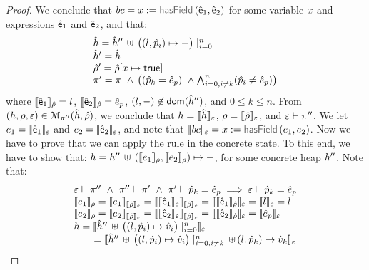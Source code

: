 \begin{proof}
\noindent{}
We conclude that  $\bcmd = \jvar := \hasfield(\pvsexpr_1, \pvsexpr_2)$ for some variable $\jvar$ and expressions $\pvsexpr_1$ and $\pvsexpr_2$, and that: 
$$
\begin{array}{l}
  \sheap =   \sheap'' \, \uplus \, \big((l, \sexprp_i) \mapsto -\big)\mid_{i = 0}^n     \\
  \sheap' =  \sheap \\
  \sstore' = \sstore[\jvar \mapsto \jtrue] \\ 
    \pc' = \pc \ \wedge \, \big( (\sexprp_k = \sexpr_p) \ \wedge \bigwedge_{i = 0, i \neq k}^n (\sexprp_i \neq \sexpr_p) \big)
\end{array}
$$ 
where $\symbeval{\pvsexpr_1}{\sstore} =  \loc$, $\symbeval{\pvsexpr_2}{\sstore} =  \sexpr_p$, 
$(\loc, -) \not\in \domain(\sheap'')$, and $0 \leq k \leq n$. 
%
From $(\heap, \store, \senv) \in \smodels{\sheap, \sstore}{\pc''}$, we conclude that $\heap = \semexpr{\sheap}{\senv}$, $\store = \semexpr{\sstore}{\senv}$, and 
$\senv \vdash \pc''$. 
We let $\jsilexpr_1 = \symbeval{\pvsexpr_1}{\senv}$ and  
$\jsilexpr_2 = \symbeval{\pvsexpr_2}{\senv}$, and note that $\symbeval{\bcmd}{\senv} = \jvar := \hasfield(\jsilexpr_1, \jsilexpr_2)$.
Now we have to prove that we can apply the  rule in the concrete state.
To this end, we have to show that:
$\heap = \heap'' \dunion (\symbeval{\jsilexpr_1}{\store}, \symbeval{\jsilexpr_2}{\store}) \mapsto -$, for 
some concrete heap $\heap''$. 
Note that: 
$$
\begin{array}{l}
%
\senv \vdash \pc'' \ \wedge \ \pc'' \vdash \pc' \ \wedge \ \pc' \vdash \sexprp_k = \sexpr_p \implies \senv \vdash \sexprp_k = \sexpr_p \\
%
 \symbeval{\jsilexpr_1}{\store} = \symbeval{\jsilexpr_1}{\symbeval{\sstore}{\senv}} = \symbeval{\symbeval{\pvsexpr_1}{\senv}}{\symbeval{\sstore}{\senv}} = \symbeval{\symbeval{\pvsexpr_1}{\sstore}}{\senv} 
    = \symbeval{\loc}{\senv} = \loc \\ 
  \symbeval{\jsilexpr_2}{\store}  = \symbeval{\jsilexpr_2}{\semexpr{\sstore}{\senv}} =  \symbeval{\symbeval{\pvsexpr_2}{\senv}}{\symbeval{\sstore}{\senv}} = \symbeval{\symbeval{\pvsexpr_2}{\sstore}}{\senv}
   =  \symbeval{\sexpr_p}{\senv} \\
 \heap = \semexpr{\sheap'' \, \uplus \, \big((l, \sexprp_i) \mapsto \sexprv_i\big)\mid_{i = 0}^n}{\senv} \\
    \qquad = \semexpr{\sheap'' \, \uplus \, \big((l, \sexprp_i) \mapsto \sexprv_i\big)\mid_{i = 0, i\neq k}^n \dunion (l, \sexprp_k) \mapsto \sexprv_k}{\senv} \\

\end{array}$$
\end{proof}
